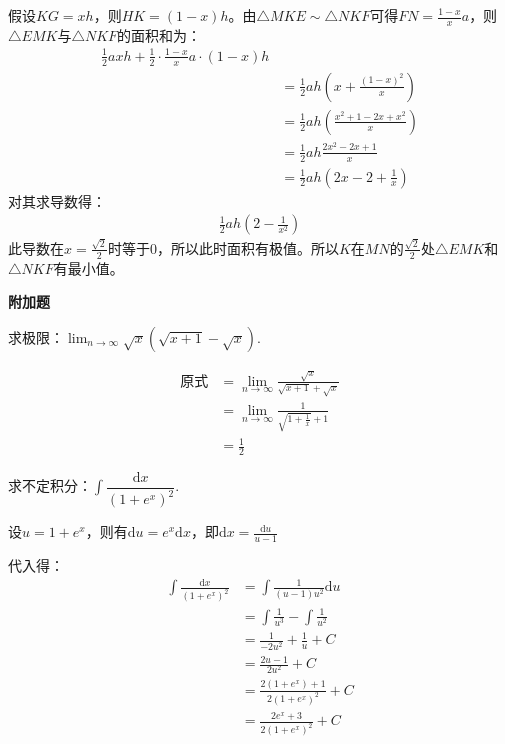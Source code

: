 \documentclass[answers]{exam}
\begin{document}
\begin{questions}
\begin{solution}
		假设$KG=xh$，则$HK=(1-x)h$。由$\triangle{MKE} \sim \triangle{NKF}$可得$FN =
			\frac{1-x}{x}a$，则$\triangle{EMK}$与$\triangle{NKF}$的面积和为：
		\begin{align*}
			\frac12axh + \frac12\cdot\frac{1-x}{x}a\cdot(1-x)h
			\\                  & = \frac12ah(x + \frac{(1-x)^2}{x})
			\\                  & = \frac12ah(\frac{x^2 + 1 - 2x + x^2}{x})
			\\                & = \frac12ah\frac{2x^2 - 2x + 1}{x}
			\\ & = \frac12ah(2x -2 + \frac1x)
		\end{align*}
		对其求导数得：
		\begin{align*}
			\frac12ah(2 - \frac{1}{x^2})
		\end{align*}
		此导数在$x =
			\frac{\sqrt{2}}{2}$时等于$0$，所以此时面积有极值。所以$K$在$MN$的$\frac{\sqrt{2}}{2}$处$\triangle{EMK}$和$\triangle{NKF}$有最小值。

	\end{solution}

	\begin{center}
		\textbf{附加题}
	\end{center}

	\question 求极限：$ \displaystyle \lim_{n\to\infty}\sqrt{x}(\sqrt{x+1} - \sqrt{x}) $.
	\begin{solution}
		\begin{align*}
			\text{原式} & = \lim_{n\to\infty}\frac{\sqrt{x}}{\sqrt{x+1} + \sqrt{x}} \\
			          & = \lim_{n\to\infty}\frac{1}{\sqrt{1 + \frac1x} + 1}       \\
			          & = \frac12
		\end{align*}
	\end{solution}
	\question 求不定积分：$\int\dfrac{\mathrm{d}x}{(1+e^x)^2}$.
	\begin{solution}
		设$u = 1 + e^x$，则有$\mathrm{d}u = e^x\mathrm{d}x$，即$\mathrm{d}x = \frac{\mathrm{d}u}{u-1}$

		代入得：
		\begin{align*}
			\int\frac{\mathrm{d}x}{(1+e^x)^2} & = \int\frac{1}{(u-1)u^2}\mathrm{d}u     \\
			                                  & = \int\frac{1}{u^3} - \int\frac{1}{u^2} \\
			                                  & = \frac{1}{-2u^2} + \frac{1}{u} + C     \\
			                                  & = \frac{2u - 1}{2u^2}  + C              \\
			                                  & = \frac{2(1+e^x) + 1}{2(1+e^x)^2} + C   \\
			                                  & = \frac{2e^x + 3}{2(1+e^x)^2}  + C
		\end{align*}
	\end{solution}
\end{questions}
\end{document}
